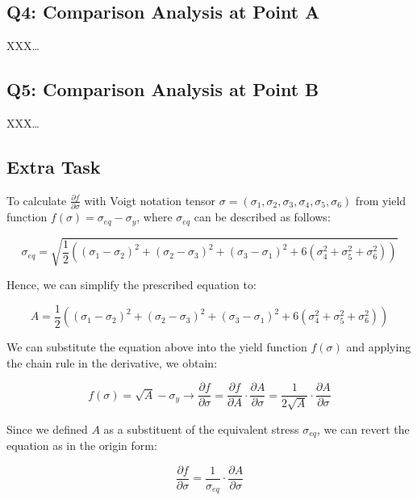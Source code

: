 \documentclass[12pt]{article}
\begin{document}
\subsection*{Q4: Comparison Analysis at Point A}
XXX…

\subsection*{Q5: Comparison Analysis at Point B}
XXX…

\subsection*{Extra Task}
To calculate $\frac{\partial{f}}{\partial{\sigma}}$ with Voigt notation tensor $\sigma = (\sigma_1, \sigma_2, \sigma_3, \sigma_4, \sigma_5, \sigma_6)$ from yield function 
$f(\sigma)=\sigma_{eq} - \sigma_y$, where $\sigma_{eq}$ can be described as follows:

\begin{equation}
\sigma_{eq} = \sqrt{\frac{1}{2} \left( (\sigma_1 - \sigma_2)^2 + (\sigma_2 - \sigma_3)^2 + (\sigma_3 - \sigma_1)^2 + 6(\sigma_4^2 + \sigma_5^2 + \sigma_6^2) \right)}
\end{equation}

Hence, we can simplify the prescribed equation to:

\begin{equation}
A = \frac{1}{2} \left( (\sigma_1 - \sigma_2)^2 + (\sigma_2 - \sigma_3)^2 + (\sigma_3 - \sigma_1)^2 + 6(\sigma_4^2 + \sigma_5^2 + \sigma_6^2) \right)
\end{equation}

We can substitute the equation above into the yield function $f(\sigma)$ and applying the chain rule in the 
derivative, we obtain:

\begin{equation}
f(\sigma) = \sqrt{A} - \sigma_y \rightarrow \frac{\partial{f}}{\partial{\sigma}} = \frac{\partial{f}}{\partial{A}} \cdot \frac{\partial{A}}{\partial{\sigma}} = \frac{1}{2\sqrt{A}} \cdot \frac{\partial{A}}{\partial{\sigma}}
\end{equation}

Since we defined $A$ as a substituent of the equivalent stress $\sigma_{eq}$, we can revert the equation as in the origin form:

\begin{equation}
    \frac{\partial{f}}{\partial{\sigma}} = \frac{1}{\sigma_{eq}} \cdot \frac{\partial{A}}{\partial{\sigma}}
\end{equation}
\end{document}
